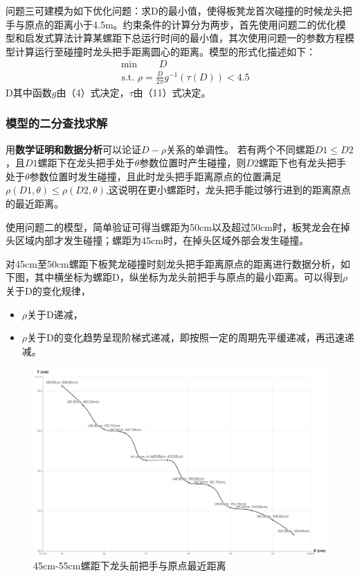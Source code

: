 \documentclass[a4paper]{article}
\begin{document}
 问题三可建模为如下优化问题：求D的最小值，使得板凳龙首次碰撞的时候龙头把手与原点的距离小于4.5m。约束条件的计算分为两步，首先使用问题二的优化模型和启发式算法计算某螺距下总运行时间的最小值，其次使用问题一的参数方程模型计算运行至碰撞时龙头把手距离圆心的距离。模型的形式化描述如下：
   		\begin{equation}
   \begin{aligned}
				& \min \quad \quad D \\
				& \text { s.t. }
    \rho = \frac{D}{2 \pi} g^{-1}(\tau(D))< 4.5
    \end{aligned}
		\end{equation}
      D其中函数$g$由（4）式决定，$\tau$由（11）式决定。
        \subsubsection{模型的二分查找求解}

        用\textbf{数学证明和数据分析}可以论证$D-\rho$关系的单调性。
        若有两个不同螺距$D1 \le D2$，且$D1$螺距下在龙头把手处于$\theta$参数位置时产生碰撞，则$D2$螺距下也有龙头把手处于$\theta$参数位置时发生碰撞，且此时龙头把手距离原点的位置满足$\rho(D1, \theta) \le \rho(D2, \theta)$,这说明在更小螺距时，龙头把手能过够行进到的距离原点的最近距离。

        使用问题二的模型，简单验证可得当螺距为50cm以及超过50cm时，板凳龙会在掉头区域内部才发生碰撞；螺距为45cm时，在掉头区域外部会发生碰撞。

        对45cm至50cm螺距下板凳龙碰撞时刻龙头把手距离原点的距离进行数据分析，如下图，其中横坐标为螺距D，纵坐标为龙头前把手与原点的最小距离。可以得到$\rho$关于D的变化规律，
        \begin{itemize}
        \item $\rho$关于D递减，
        \item $\rho$关于D的变化趋势呈现阶梯式递减，即按照一定的周期先平缓递减，再迅速递减。
        \end{itemize}
\begin{figure}
    \centering
    \includegraphics[width=0.5\linewidth]{image/analasis_3.png}
    \caption{45cm-55cm螺距下龙头前把手与原点最近距离}
    \label{fig:enter-label}
\end{figure}
\end{document}
